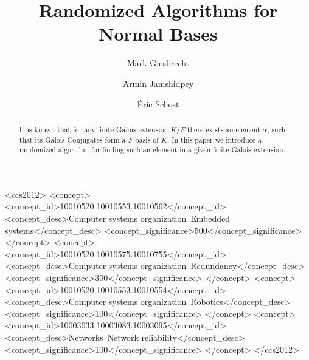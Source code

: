 \documentclass[sigconf]{acmart}
\theoremstyle{acmplain}
\begin{document}
\title{Randomized Algorithms for Normal Bases}


\author{Mark Giesbrecht
}

\author{Armin Jamshidpey}

\author{\'Eric Schost}


\renewcommand{\shortauthors}{M. Giesbrecht et al.}




\begin{abstract}
It is known that for any finite Galois extension $K/F$ there exists an element $\alpha$, such that its Galois 
Conjugates form a $F$-basis of $K$. In this paper we introduce a randomized algorithm for finding such an 
element in a given finite Galois extension.   
\end{abstract}

%
%
\begin{CCSXML}
<ccs2012>
 <concept>
  <concept_id>10010520.10010553.10010562</concept_id>
  <concept_desc>Computer systems organization~Embedded systems</concept_desc>
  <concept_significance>500</concept_significance>
 </concept>
 <concept>
  <concept_id>10010520.10010575.10010755</concept_id>
  <concept_desc>Computer systems organization~Redundancy</concept_desc>
  <concept_significance>300</concept_significance>
 </concept>
 <concept>
  <concept_id>10010520.10010553.10010554</concept_id>
  <concept_desc>Computer systems organization~Robotics</concept_desc>
  <concept_significance>100</concept_significance>
 </concept>
 <concept>
  <concept_id>10003033.10003083.10003095</concept_id>
  <concept_desc>Networks~Network reliability</concept_desc>
  <concept_significance>100</concept_significance>
 </concept>
</ccs2012>  
\end{CCSXML}

%
%
\end{document}
